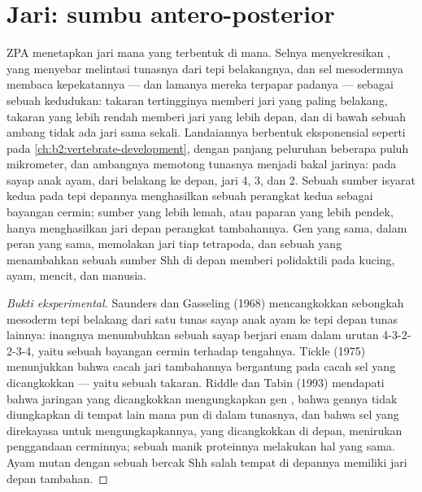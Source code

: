 \section{Jari: sumbu antero-posterior}

\begin{proposition}\label{prop:b2:limb-organogenesis:zpa}
ZPA menetapkan jari mana yang terbentuk di mana. Selnya menyekresikan
, yang menyebar melintasi tunasnya dari tepi belakangnya,
dan sel mesodermnya membaca kepekatannya --- dan lamanya mereka
terpapar padanya --- sebagai sebuah kedudukan: takaran tertingginya
memberi jari yang paling belakang, takaran yang lebih rendah memberi
jari yang lebih depan, dan di bawah sebuah ambang tidak ada jari sama
sekali. Landaiannya berbentuk eksponensial seperti pada
\cref{ch:b2:vertebrate-development}, dengan panjang peluruhan beberapa
puluh mikrometer, dan ambangnya memotong tunasnya menjadi bakal
jarinya: pada sayap anak ayam, dari belakang ke depan, jari 4, 3, dan 2.
Sebuah sumber isyarat kedua pada tepi depannya menghasilkan sebuah
perangkat kedua sebagai bayangan cermin; sumber yang lebih lemah, atau
paparan yang lebih pendek, hanya menghasilkan jari depan perangkat
tambahannya. Gen yang sama, dalam peran yang sama, memolakan jari tiap
tetrapoda, dan sebuah  yang menambahkan sebuah sumber Shh di
depan memberi polidaktili pada kucing, ayam, mencit, dan manusia.
\end{proposition}
\begin{proof}[Bukti eksperimental]
Saunders dan Gasseling (1968) mencangkokkan sebongkah mesoderm tepi
belakang dari satu tunas sayap anak ayam ke tepi depan tunas lainnya:
inangnya menumbuhkan sebuah sayap berjari enam dalam urutan
4-3-2-2-3-4, yaitu sebuah bayangan cermin terhadap tengahnya. Tickle
(1975) menunjukkan bahwa cacah jari tambahannya bergantung pada cacah
sel yang dicangkokkan --- yaitu sebuah takaran. Riddle dan Tabin (1993)
mendapati bahwa jaringan yang dicangkokkan mengungkapkan gen
\emph{}, bahwa gennya tidak diungkapkan di tempat lain
mana pun di dalam tunasnya, dan bahwa sel yang direkayasa untuk
mengungkapkannya, yang dicangkokkan di depan, menirukan penggandaan
cerminnya; sebuah manik proteinnya melakukan hal yang sama. Ayam mutan
dengan sebuah bercak Shh salah tempat di depannya memiliki jari depan
tambahan.
\end{proof}

